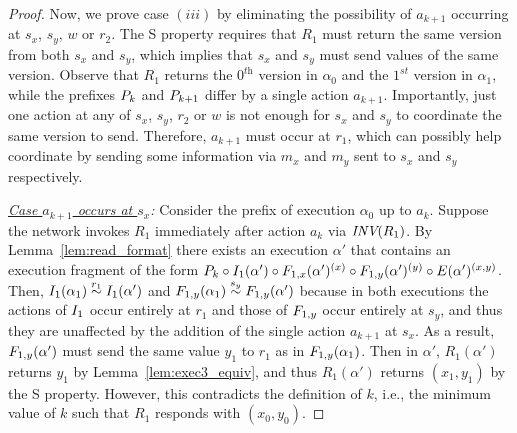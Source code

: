 \begin{proof}
Now, we prove case $(iii)$ by eliminating the possibility of  $a_{k+1}$ occurring at $s_x$, $s_y$, $w$ or $r_2$.
%
The S property requires that $R_1$ must return the same version from both $s_x$ and $s_y$, which implies that $s_x$ and  $s_y$ must send values of the same version.
%
%
Observe that $R_1$ returns the $0^{\textit{th}}$ version in $\alpha_0$ and the $1^{\textit{st}}$ version in $\alpha_1$,
 while the prefixes $\fragt{P_k}{\alpha_0}{}$ and 
 $\fragt{P_{k+1}}{\alpha_1}{}$ differ by a single action $a_{k+1}$. Importantly, just one action at any of  $s_x$, $s_y$, $r_2$
or $w$ is not enough for $s_x$ and $s_y$ to coordinate the same version to send. Therefore, $a_{k+1}$ must occur at $r_1$, which can 
possibly help coordinate by sending some information via $m_x$ and $m_y$ sent to $s_x$ and $s_y$ respectively.

\emph{ \underline{Case $a_{k+1}$ occurs at $s_x$}:} Consider the  prefix of execution $\alpha_0$ up to $a_k$.  Suppose the network invokes 
$R_1$ immediately after action $a_{k}$ via ${\textit{INV}(R_1)}$. By Lemma~\ref{lem:read_format} there exists  
an execution $\alpha'$ that contains an  execution fragment of the form
$\fragt{P_k}{\alpha'}{}
  \circ\frage{I_1}{\alpha'}{} \circ  \frage{F_{1,x}}{\alpha'}{x} 
  \circ\frage{F_{1,y}}{\alpha'}{y}
  \circ \frage{E}{\alpha'}{x, y}$.
Then, $\frage{I_1}{\alpha_1}{} \stackrel{r_1}{\sim} \frage{I_1}{\alpha'}{}$ and
  $\frage{F_{1,y}}{\alpha_1}{} \stackrel{s_y}{\sim} \frage{F_{1,y}}{\alpha'}{}$
  because in both executions the actions of $\frage{I_1}{}{}$ occur entirely at $r_1$
  and those of $\frage{F_{1,y}}{}{}$ occur entirely at $s_y$,
  and thus they are unaffected by the addition of the single action $a_{k+1}$ at $s_x$.  
As a result,  $\frage{F_{1,y}}{\alpha'}{}$ must send the same value $y_1$ to $r_1$ as 
 in  $\frage{F_{1,y}}{\alpha_1}{}$.
%
Then in $\alpha'$, $R_1(\alpha')$ returns $y_1$ by Lemma~\ref{lem:exec3_equiv}, and thus $R_1(\alpha')$ returns $(x_1, y_1)$ by the 
S property. However, this contradicts the 
definition of $k$, i.e., the minimum value of $k$ such that $R_1$ responds with $(x_0, y_0)$.


\end{proof}

